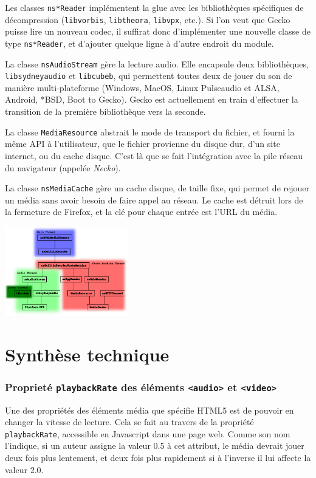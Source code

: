 \documentclass[a4paper,10pt]{article}
\newcommand{\cc}[1]{\texttt{#1}}
\begin{document}
\begin{multicols}{2}
  Les classes \cc{ns*Reader} implémentent la glue avec les bibliothèques
  spécifiques de décompression (\cc{libvorbis}, \cc{libtheora}, \cc{libvpx},
  etc.). Si l'on veut que Gecko puisse lire un nouveau codec, il suffirat donc
  d'implémenter une nouvelle classe de type \cc{ns*Reader}, et d'ajouter quelque
  ligne à d'autre endroit du module.

  La classe \cc{nsAudioStream} gère la lecture audio. Elle encapsule deux
  bibliothèques, \cc{libsydneyaudio} et \cc{libcubeb}, qui permettent toutes
  deux de jouer du son de manière multi-plateforme (Windows, MacOS, Linux
  Pulseaudio et ALSA, Android, *BSD, Boot to Gecko). Gecko est actuellement en
  train d'effectuer la transition de la première bibliothèque vers la seconde.

  La classe \cc{MediaResource} abstrait le mode de transport du fichier, et
  fourni la même API à l'utilisateur, que le fichier provienne du disque dur,
  d'un site internet, ou du cache disque. C'est là que se fait l'intégration
  avec la pile réseau du navigateur (appelée \emph{Necko}).

  La classe \cc{nsMediaCache} gère un cache disque, de taille fixe, qui permet
  de rejouer un média sans avoir besoin de faire appel au réseau. Le cache est
  détruit lors de la fermeture de Firefox, et la clé pour chaque entrée est
  l'URL du média.

  \includegraphics[width=0.40\textwidth]{img/content-media.pdf}

  \part*{Synthèse technique}
  \section{Proprieté \cc{playbackRate} des éléments \cc{<audio>} et \cc{<video>}}
  Une des propriétés des éléments média que spécifie HTML5 est de pouvoir en
  changer la vitesse de lecture. Cela se fait au travers de la propriété
  \cc{playbackRate}, accessible en Javascript dans une page web. Comme son nom
  l'indique, si un auteur assigne la valeur 0.5 à cet attribut, le média devrait
  jouer deux fois plus lentement, et deux fois plus rapidement si à l'inverse il
  lui affecte la valeur 2.0.


\end{multicols}
\end{document}
